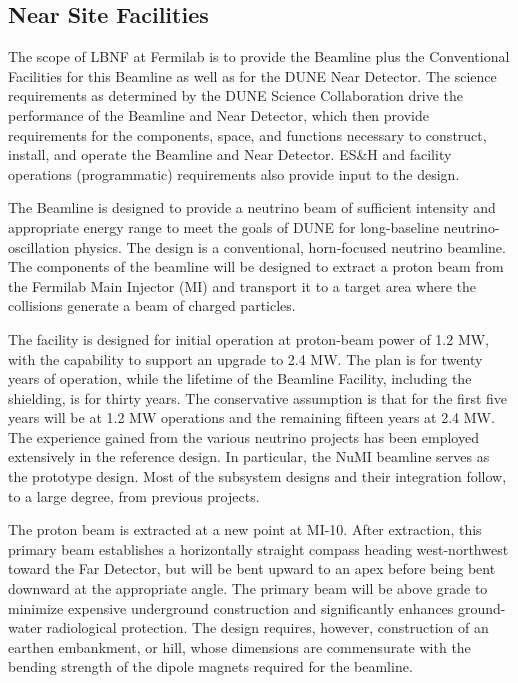 \subsection{Near Site Facilities}

The scope of LBNF at Fermilab is to provide the Beamline plus the Conventional Facilities for this Beamline as well as for the DUNE Near Detector. The science requirements as determined by the DUNE Science Collaboration drive the performance of the Beamline and Near Detector, which then provide requirements for the components, space, and functions necessary to construct, install, and operate the Beamline and Near Detector. ES\&H and facility operations (programmatic) requirements also provide input to the design.

The Beamline is designed to provide a neutrino beam of sufficient intensity and appropriate energy range to meet the goals of DUNE for long-baseline neutrino-oscillation physics. The design is a conventional, horn-focused neutrino beamline. The components of the beamline will be designed to extract a proton beam from the Fermilab Main Injector (MI) and transport it to a target area where the collisions generate a beam of charged particles. 

The facility is designed for initial operation at proton-beam power of 1.2 MW, with the capability to support an upgrade to 2.4 MW. The plan is for twenty years of operation, while the lifetime of the Beamline Facility, including the shielding, is for thirty years. The conservative assumption is that for the first five years will be at 1.2 MW operations and the remaining fifteen years at 2.4 MW.  
The experience gained from the various neutrino projects has been employed extensively in the reference design. In particular, the NuMI beamline serves as the prototype design. Most of the subsystem designs and their integration follow, to a large degree, from previous projects. 

The proton beam is extracted at a new point at MI-10. After extraction, this primary beam establishes a horizontally straight compass heading west-northwest toward the Far Detector, but will be bent upward to an apex before being bent downward at the appropriate angle. The primary beam will be above grade to minimize expensive underground construction and significantly enhances ground-water radiological protection. The design requires, however, construction of an earthen embankment, or hill, whose dimensions are commensurate with the bending strength of the dipole magnets required for the beamline. 

